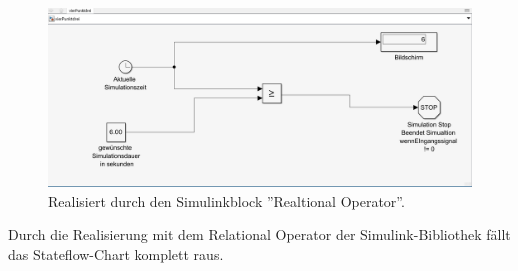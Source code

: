 \documentclass{article}
\begin{document}
		\subsection{}
			\begin{figure}[h]
				\centering
				\includegraphics[scale=0.5]{Aufgabe4.3c.png}
				\caption{Realisiert durch den Simulinkblock ''Realtional Operator''.}
				\label{fig_8: Aufg_3c_Realtional_Operator}
			\end{figure}
			Durch die Realisierung mit dem Relational Operator der Simulink-Bibliothek fällt das Stateflow-Chart komplett raus.
\clearpage
\end{document}
